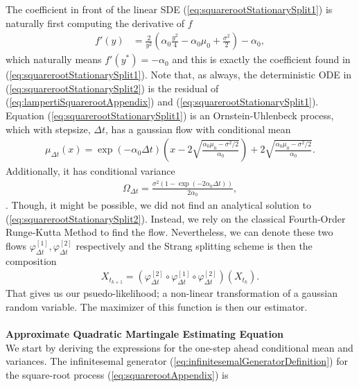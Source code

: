 The coefficient in front of the linear SDE (\ref{eq:squarerootStationarySplit1}) is naturally first computing the derivative of $f$
\begin{align}
    f'(y) &= \frac{2}{y^2}\left(\alpha_0\frac{y^2}{4}-\alpha_0\mu_0+\frac{\sigma^2}{2}\right) - \alpha_0,
\end{align}
which naturally means $f'(y^*) = - \alpha_0$ and this is exactly the coefficient found in (\ref{eq:squarerootStationarySplit1}). Note that, as always, the deterministic ODE in (\ref{eq:squarerootStationarySplit2}) is the residual of (\ref{eq:lampertiSquarerootAppendix}) and (\ref{eq:squarerootStationarySplit1}).
Equation (\ref{eq:squarerootStationarySplit1}) is an Ornstein-Uhlenbeck process, which with stepsize, $\Delta t$, has a gaussian flow with conditional mean 
\begin{align}
    \mu_{\Delta t}(x) = \exp\left(-\alpha_0 \Delta t\right) \left(x - 2\sqrt{\frac{\alpha_0\mu_0 - \sigma^2 / 2}{\alpha_0}}\right) + 2\sqrt{\frac{\alpha_0\mu_0 - \sigma^2 / 2}{\alpha_0}}.
\end{align}
Additionally, it has conditional variance
\begin{align}
     \Omega_{\Delta t} = \frac{\sigma^2\left(1 - \exp\left(-2\alpha_0 \Delta t\right)\right)}{2\alpha_0},
\end{align}
\cite[(5), (6)]{SplittingSchemes}. Though, it might be possible, we did not find an analytical solution to (\ref{eq:squarerootStationarySplit2}). Instead, we rely on the classical Fourth-Order Runge-Kutta Method \cite[p. 541]{numericalAnalysis} to find the flow. Nevertheless, we can denote these two flows $\varphi_{\Delta t}^{[1]}, \varphi_{\Delta t}^{[2]}$ respectively and the Strang splitting scheme is then the composition
\begin{align}
    X_{t_{k + 1}} = \left(\varphi_{\Delta t}^{[2]} \circ \varphi_{\Delta t}^{[1]} \circ \varphi_{\Delta t}^{[2]}\right)\left(X_{t_k}\right).
\end{align}
That gives us our psuedo-likelihood; a non-linear transformation of a gaussian random variable. The maximizer of this function is then our estimator. \\\\
\noindent \textbf{Approximate Quadratic Martingale Estimating Equation}\\
We start by deriving the expressions for the one-step ahead conditional mean and variances. The infinitesemal generator (\ref{eq:infinitesemalGeneratorDefinition}) for the square-root process (\ref{eq:squarerootAppendix}) is 
